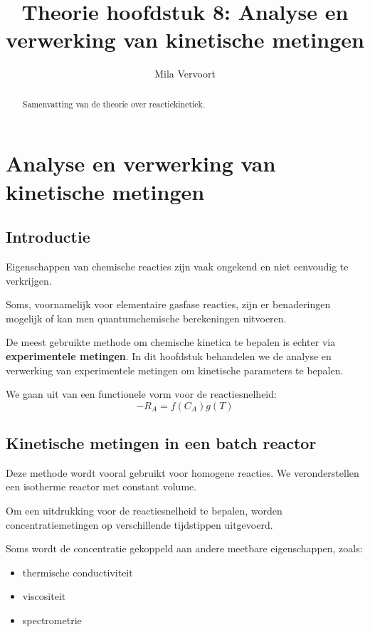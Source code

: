\documentclass{ximera}
\title{Theorie hoofdstuk 8: Analyse en verwerking van
kinetische metingen}
\author{Mila Vervoort}
\begin{document}
\begin{abstract}
    Samenvatting van de theorie over reactiekinetiek.
\end{abstract}
\maketitle
\label{xim:theory}

\section*{Analyse en verwerking van kinetische metingen}

\subsection*{Introductie}

Eigenschappen van chemische reacties zijn vaak ongekend en niet eenvoudig te verkrijgen.

Soms, voornamelijk voor elementaire gasfase reacties, zijn er benaderingen mogelijk
of kan men quantumchemische berekeningen uitvoeren.

De meest gebruikte methode om chemische kinetica te bepalen is echter via
\textbf{experimentele metingen}. In dit hoofdstuk behandelen we de analyse
en verwerking van experimentele metingen om kinetische parameters te bepalen.

We gaan uit van een functionele vorm voor de reactiesnelheid:
\[-R_A = f(C_A)g(T)
\]

\subsection*{Kinetische metingen in een batch reactor}

Deze methode wordt vooral gebruikt voor homogene reacties. We veronderstellen een
isotherme reactor met constant volume.

Om een uitdrukking voor de reactiesnelheid te bepalen, worden concentratiemetingen op verschillende tijdstippen uitgevoerd.

Soms wordt de concentratie gekoppeld aan andere meetbare eigenschappen, zoals:

\begin{itemize}
\item thermische conductiviteit
\item viscositeit
\item spectrometrie
\end{itemize}
\end{document}

